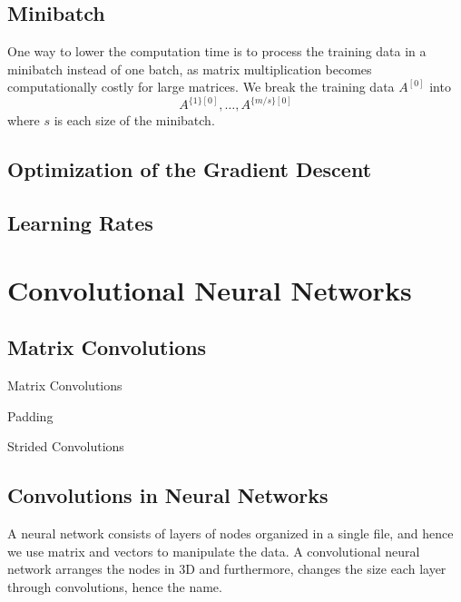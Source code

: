 \documentclass[a4paper]{article}
\begin{document}
\begin{enumerate}
\subsection{Minibatch}
One way to lower the computation time is to process the training data in a minibatch instead of one batch, as matrix multiplication becomes computationally costly for large matrices. We break the training data $A^{[0]}$ into $$A^{\{1\}[0]},\dots,A^{\{m/s\}[0]}$$ where $s$ is each size of the minibatch. 

\subsection{Optimization of the Gradient Descent}
\subsection{Learning Rates}

\pagebreak
\section{Convolutional Neural Networks}
\subsection{Matrix Convolutions}
\begin{defn}{Matrix Convolutions}{}
\end{defn}

\begin{defn}{Padding}{}
\end{defn}

\begin{defn}{Strided Convolutions}{}
\end{defn}

\subsection{Convolutions in Neural Networks}
A neural network consists of layers of nodes organized in a single file, and hence we use matrix and vectors to manipulate the data. A convolutional neural network arranges the nodes in 3D and furthermore, changes the size each layer through convolutions, hence the name. 


\end{enumerate}
\end{document}
